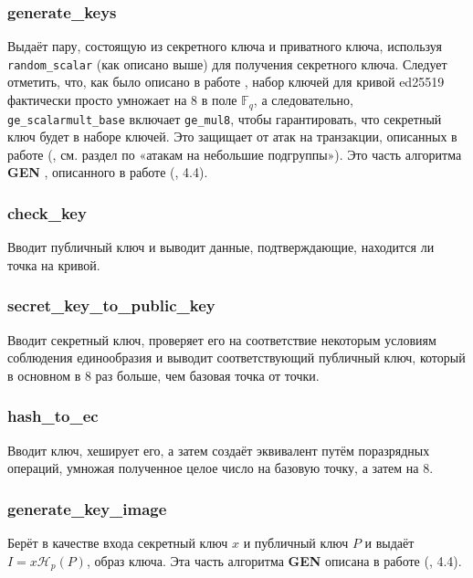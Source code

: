 \documentclass{mrl}
\numberwithin{equation}{section}
\numberwithin{figure}{section}
\begin{document}
\subsubsection{\label{sub:generate_keys}generate\_keys}

Выдаёт пару, состоящую из секретного ключа и приватного ключа, используя \texttt{random\_scalar}  (как описано выше) для получения секретного ключа. Следует отметить, что, как было описано в работе \cite{Bern}, набор ключей для кривой ed25519 фактически просто умножает на $8$ в поле $\mathbb{F}_{q}$, а следовательно, \texttt{ge\_scalarmult\_base} включает \texttt{ge\_mul8}, чтобы гарантировать, что секретный ключ будет в наборе ключей. Это защищает от атак на транзакции, описанных в работе (\cite{Bern}, см. раздел по «атакам на небольшие подгруппы»). Это часть алгоритма \textbf{GEN} , описанного в работе (\cite{CN}, 4.4).

\subsubsection{check\_key}

Вводит публичный ключ и выводит данные, подтверждающие, находится ли точка на кривой.

\subsubsection{secret\_key\_to\_public\_key}

Вводит секретный ключ, проверяет его на соответствие некоторым условиям соблюдения единообразия и выводит соответствующий публичный ключ, который в основном в 8 раз больше, чем базовая точка от точки.

\subsubsection{hash\_to\_ec}

Вводит ключ, хеширует его, а затем создаёт эквивалент путём поразрядных операций, умножая полученное целое число на базовую точку, а затем на $8$.

\subsubsection{generate\_key\_image}

Берёт в качестве входа секретный ключ $x$ и публичный ключ $P$ и выдаёт $I=x\mathcal{H}_{p}\left(P\right)$, образ ключа. Эта часть алгоритма \textbf{GEN} описана в работе (\cite{CN}, 4.4).
\end{document}
